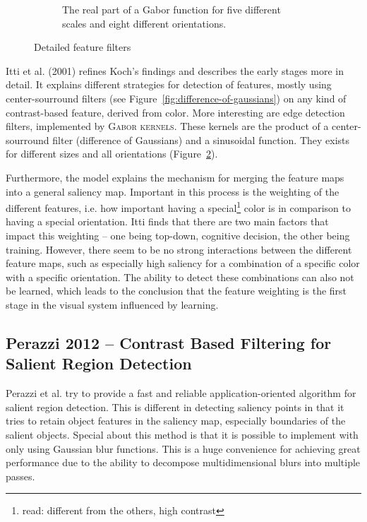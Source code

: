\documentclass[a4paper,12pt,fleqn,oneside]{scrartcl}
\begin{document}
\begin{figure}[htb]
\begin{subfigure}[b]{0.48\textwidth}
        \caption{The real part of a Gabor function for five different scales and eight different orientations.}
        \label{fig:gabor-orientations}
    \end{subfigure}
    \caption[\url{http://www.intechopen.com/source/html/16592/media/image74.png}]{Detailed feature filters}
\end{figure}
    
Itti et al. (2001) refines Koch's findings and describes the early stages more in detail. It explains different strategies for
detection of  features, mostly using center-sourround filters (see Figure~\ref{fig:difference-of-gaussians}) on any kind
of contrast-based feature, derived from color. More interesting are edge detection filters, implemented by \textsc{Gabor
kernels}. These kernels are the product of a center-sourround filter (difference of Gaussians) and a sinusoidal
function. They exists for different sizes and all orientations (Figure~\ref{fig:gabor-orientations}).

Furthermore, the model explains the mechanism for merging the feature maps into a general saliency map. Important in this
process is the weighting of the different features, i.e. how important having a special\footnote{read: different from
the others, high contrast} color is in comparison to having a special orientation. Itti finds that there are two main
factors that impact this weighting -- one being top-down, cognitive decision, the other being training. However, there
seem to be no strong interactions between the different feature maps, such as especially high saliency for a combination
of a specific color with a specific orientation. The ability to detect these combinations can also not be learned, which
leads to the conclusion that the feature weighting is the first stage in the visual system influenced by learning.

\subsection{Perazzi 2012 -- Contrast Based Filtering for Salient Region Detection}

Perazzi et al. try to provide a fast and reliable application-oriented algorithm for salient region detection. This is
different in detecting saliency points in that it tries to retain object features in the saliency map, especially
boundaries of the salient objects. Special about this method is that it is possible to implement with only using
Gaussian blur functions. This is a huge convenience for achieving great performance due to the ability to decompose
multidimensional blurs into multiple passes.
\end{document}
